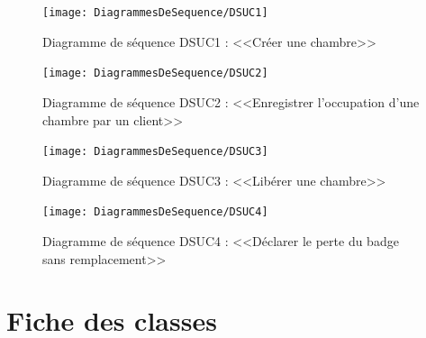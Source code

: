 \documentclass[11pt,article]{article}
\begin{document}
\begin{figure}[h!]
  \texttt{[image: DiagrammesDeSequence/DSUC1]}
  \caption{Diagramme de séquence DSUC1 : <<Créer une chambre>>}
  \label{umlet_diag_seq1}
\end{figure}

\newpage

\begin{figure}[h!]
  \texttt{[image: DiagrammesDeSequence/DSUC2]}
  \caption{Diagramme de séquence DSUC2 : <<Enregistrer l'occupation d'une chambre par un client>>}
  \label{umlet_diag_seq2}
\end{figure}

\newpage

\begin{figure}[h!]
  \texttt{[image: DiagrammesDeSequence/DSUC3]}
  \caption{Diagramme de séquence DSUC3 : <<Libérer une chambre>>}
  \label{umlet_diag_seq3}
\end{figure}

\newpage

\begin{figure}[h!]
  \texttt{[image: DiagrammesDeSequence/DSUC4]}
  \caption{Diagramme de séquence DSUC4 : <<Déclarer le perte du badge sans remplacement>>}
  \label{umlet_diag_seq4}
\end{figure}
\newpage

\section{Fiche des classes}
\end{document}
